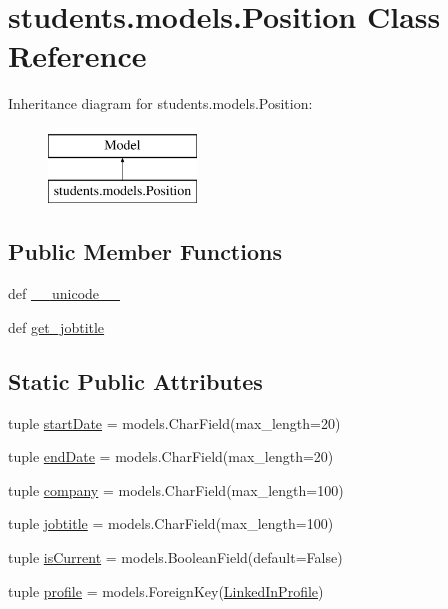 \hypertarget{classstudents_1_1models_1_1_position}{\section{students.\-models.\-Position Class Reference}
\label{classstudents_1_1models_1_1_position}
}
Inheritance diagram for students.\-models.\-Position\-:\begin{figure}[H]
\begin{center}
\leavevmode
\includegraphics[height=2.000000cm]{classstudents_1_1models_1_1_position}
\end{center}
\end{figure}
\subsection*{Public Member Functions}
\begin{DoxyCompactItemize}
\item 
def \hyperlink{classstudents_1_1models_1_1_position_a9801bf25c27f58f0d7306f8df13b400e}{\-\_\-\-\_\-unicode\-\_\-\-\_\-}
\item 
def \hyperlink{classstudents_1_1models_1_1_position_ae6db8ec9d406188f652ec3d344f67f7b}{get\-\_\-jobtitle}
\end{DoxyCompactItemize}
\subsection*{Static Public Attributes}
\begin{DoxyCompactItemize}
\item 
tuple \hyperlink{classstudents_1_1models_1_1_position_ac2b78c8bf158e58d59783e6ec2a3507f}{start\-Date} = models.\-Char\-Field(max\-\_\-length=20)
\item 
tuple \hyperlink{classstudents_1_1models_1_1_position_ae2f7035f644cc07659733c538cc17672}{end\-Date} = models.\-Char\-Field(max\-\_\-length=20)
\item 
tuple \hyperlink{classstudents_1_1models_1_1_position_ac37b3ab263fab4dec8977add069b5bf6}{company} = models.\-Char\-Field(max\-\_\-length=100)
\item 
tuple \hyperlink{classstudents_1_1models_1_1_position_a20d8abf316914fea1d9f69d26c531759}{jobtitle} = models.\-Char\-Field(max\-\_\-length=100)
\item 
tuple \hyperlink{classstudents_1_1models_1_1_position_a5946dc44ba06da0bc7e92d7e2b3c3cab}{is\-Current} = models.\-Boolean\-Field(default=False)
\item 
tuple \hyperlink{classstudents_1_1models_1_1_position_ad2df3949444f644d538a93d7e829f9f7}{profile} = models.\-Foreign\-Key(\hyperlink{classstudents_1_1models_1_1_linked_in_profile}{Linked\-In\-Profile})
\end{DoxyCompactItemize}



